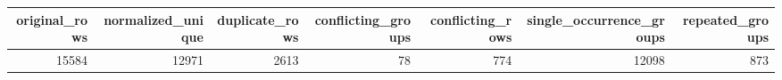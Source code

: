 \begin{tabular}{rrrrrrr}
\toprule
original\_rows & normalized\_unique & duplicate\_rows & conflicting\_groups & conflicting\_rows & single\_occurrence\_groups & repeated\_groups \\
\midrule
15584 & 12971 & 2613 & 78 & 774 & 12098 & 873 \\
\bottomrule
\end{tabular}
